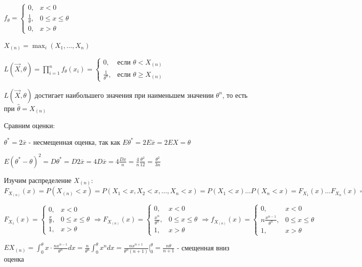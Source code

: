 \documentclass[12pt]{article}
\begin{document}
$f_\theta = \begin{cases}0, & x < 0 \\ \frac{1}{\theta}, & 0 \leq x \leq \theta \\ 0, & x > \theta \end{cases}$

$X_{(n)} = \max_i (X_1, \dots, X_n)$

$L(\vec{X}, \theta) = \prod_{i = 1}^n f_\theta (x_i) = 
\begin{cases}
    0, & \text{если } \theta < X_{(n)} \\ 
    \frac{1}{\theta^n}, & \text{если } \theta \geq X_{(n)}
\end{cases}$

$L(\vec{X}, \theta)$ достигает наибольшего значения при наименьшем значении $\theta^n$, то есть при $\hat{\theta} = X_{(n)}$

Сравним оценки:

$\theta^* = 2 \overline{x}$ - несмещенная оценка, так как $E\theta^* = 2E\overline{x} = 2E X = \theta$

$E(\theta^* - \theta)^2 = D\theta^* = D2\overline{x} = 4D\overline{x} = 4\frac{Dx}{n} = \frac{4}{n}\frac{\theta^2}{12} = \frac{\theta^2}{3n}$

Изучим распределение $X_{(n)}$: $F_{X_{(n)}}(x) = P(X_{(n)} < x) = P(X_1 < x, X_2 < x, \dots, X_n < x) = 
P(X_1 < x) \dots P(X_n < x) = F_{X_1}(x) \dots F_{X_n}(x) = F^n_{(x_1)}(x)$

$F_{X_1} (x) = \begin{cases}
    0, & x < 0 \\
    \frac{x}{\theta}, & 0 \leq x \leq \theta \\
    1, & x > \theta
\end{cases} \Longrightarrow F_{X_{(n)}}(x) = \begin{cases}
    0, & x < 0 \\
    \frac{x^n}{\theta^n}, & 0 \leq x \leq \theta \\
    1, & x > \theta
\end{cases} \Longrightarrow f_{X_{(n)}}(x) = \begin{cases}
    0, & x < 0 \\
    n\frac{x^{n - 1}}{\theta^n}, & 0 \leq x \leq \theta \\
    1, & x > \theta
\end{cases}$

$EX_{(n)} = \int_0^\theta x \cdot \frac{nx^{n - 1}}{\theta^n} dx = \frac{n}{\theta^n} \int_0^\theta x^n dx = \frac{n x^{n + 1}}{\theta^n (n + 1)} \Big|_0^\theta = 
\frac{n\theta}{n + 1}$ - смещенная вниз оценка
\end{document}
